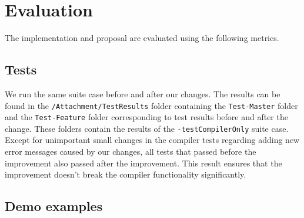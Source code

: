 \chapter{Evaluation}

The implementation and proposal are evaluated using the following metrics.

\section{Tests}

We run the same suite case before and after our changes. 
The results can be found in the \texttt{/Attachment/TestResults} folder containing the \texttt{Test-Master} folder and the \texttt{Test-Feature} folder corresponding to test results before and after the change. 
These folders contain the results of the \texttt{-testCompilerOnly} suite case. 
Except for unimportant small changes in the compiler tests regarding adding new error messages caused by our changes, all tests that passed before the improvement also passed after the improvement. 
This result ensures that the improvement doesn’t break the compiler functionality significantly.

\section{Demo examples}

